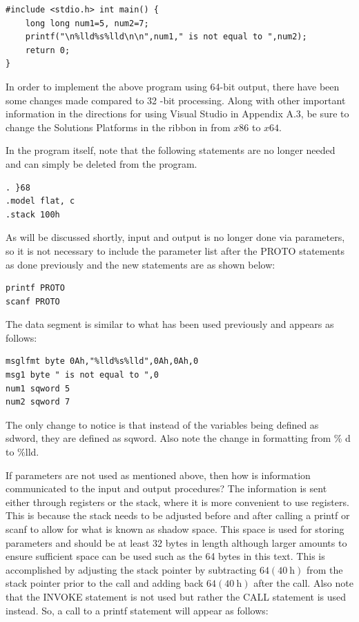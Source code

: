 \documentclass[10pt]{article}
\begin{document}
\begin{verbatim}
#include <stdio.h> int main() {
    long long num1=5, num2=7;
    printf("\n%lld%s%lld\n\n",num1," is not equal to ",num2);
    return 0;
}
\end{verbatim}

In order to implement the above program using 64-bit output, there have been some changes made compared to 32 -bit processing. Along with other important information in the directions for using Visual Studio in Appendix A.3, be sure to change the Solutions Platforms in the ribbon in from $x 86$ to $x 64$.

In the program itself, note that the following statements are no longer needed and can simply be deleted from the program.

\begin{verbatim}
. }68
.model flat, c
.stack 100h
\end{verbatim}

As will be discussed shortly, input and output is no longer done via parameters, so it is not necessary to include the parameter list after the PROTO statements as done previously and the new statements are as shown below:

\begin{verbatim}
printf PROTO
scanf PROTO
\end{verbatim}

The data segment is similar to what has been used previously and appears as follows:

\begin{verbatim}
msglfmt byte 0Ah,"%lld%s%lld",0Ah,0Ah,0
msg1 byte " is not equal to ",0
num1 sqword 5
num2 sqword 7
\end{verbatim}

The only change to notice is that instead of the variables being defined as sdword, they are defined as sqword. Also note the change in formatting from \% d to \%lld.

If parameters are not used as mentioned above, then how is information communicated to the input and output procedures? The information is sent either through registers or the stack, where it is more convenient to use registers. This is because the stack needs to be adjusted before and after calling a printf or scanf to allow for what is known as shadow space. This space is used for storing parameters and should be at least 32 bytes in length although larger amounts to ensure sufficient space can be used such as the 64 bytes in this text. This is accomplished by adjusting the stack pointer by subtracting $64(40 \mathrm{~h})$ from the stack pointer prior to the call and adding back $64(40 \mathrm{~h})$ after the call. Also note that the INVOKE statement is not used but rather the CALL statement is used instead. So, a call to a printf statement will appear as follows:
\end{document}
